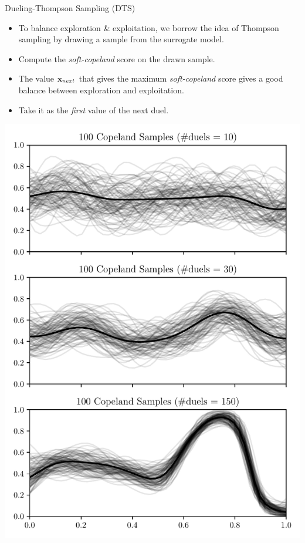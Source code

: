 \documentclass[13pt,aspectratio=1610]{beamer}
\begin{document}
\begin{frame}{Dueling-Thompson Sampling (DTS)}
\begin{minipage}{0.65\textwidth}
\begin{itemize}
\item To balance exploration \& exploitation, we borrow the idea of Thompson sampling by drawing a sample from the surrogate model.
\item Compute the \emph{soft-copeland} score on the drawn sample.
\item The value ${\bf x}_{next}$ that gives the maximum \emph{soft-copeland} score gives a good balance between exploration and exploitation.
\item Take it as the \emph{first} value of the next duel. 
\end{itemize}
\end{minipage}
%
\begin{minipage}{.3\textwidth}
\includegraphics[height=0.9\textheight]{sample_multiple_copeland.pdf}
\end{minipage}
\end{frame}
\end{document}
